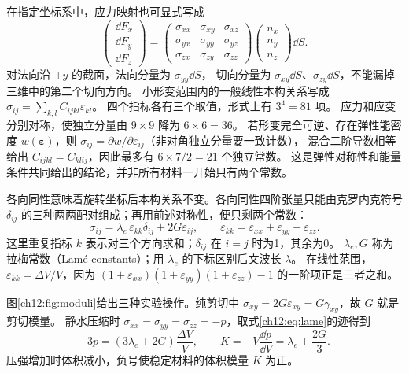 在指定坐标系中，应力映射也可显式写成
\[
 \begin{pmatrix}\dd F_x\\\dd F_y\\\dd F_z\end{pmatrix}
 =
 \begin{pmatrix}
 \sigma_{xx}&\sigma_{xy}&\sigma_{xz}\\
 \sigma_{yx}&\sigma_{yy}&\sigma_{yz}\\
 \sigma_{zx}&\sigma_{zy}&\sigma_{zz}
 \end{pmatrix}
 \begin{pmatrix}n_x\\n_y\\n_z\end{pmatrix}\dd S.
\]
对法向沿 $+y$ 的截面，法向分量为 $\sigma_{yy}\dd S$，
切向分量为 $\sigma_{xy}\dd S$、$\sigma_{zy}\dd S$，不能漏掉三维中的第二个切向方向。
小形变范围内的一般线性本构关系写成
$\sigma_{ij}=\sum_{k,l}C_{ijkl}\varepsilon_{kl}$。
四个指标各有三个取值，形式上有 $3^4=81$ 项。
应力和应变分别对称，使独立分量由 $9\times9$ 降为 $6\times6=36$。
若形变完全可逆、存在弹性能密度 $w(\boldsymbol\varepsilon)$，则
$\sigma_{ij}=\partial w/\partial\varepsilon_{ij}$（非对角独立分量要一致计数），
混合二阶导数相等给出 $C_{ijkl}=C_{klij}$，因此最多有 $6\times7/2=21$ 个独立常数。
这是弹性对称性和能量条件共同给出的结论，并非所有材料一开始只有两个常数。

各向同性意味着旋转坐标后本构关系不变。各向同性四阶张量只能由克罗内克符号
$\delta_{ij}$ 的三种两两配对组成；再用前述对称性，便只剩两个常数：
\begin{equation}
 \sigma_{ij}=\lambda_e\,\varepsilon_{kk}\delta_{ij}+2G\varepsilon_{ij},
 \qquad \varepsilon_{kk}=\varepsilon_{xx}+\varepsilon_{yy}+\varepsilon_{zz}.
 \label{ch12:eq:lame}
\end{equation}
这里重复指标 $k$ 表示对三个方向求和；$\delta_{ij}$ 在 $i=j$ 时为1，其余为0。
$\lambda_e,G$ 称为拉梅常数（Lamé constants）；用 $\lambda_e$ 的下标区别后文波长 $\lambda$。
在线性范围，$\varepsilon_{kk}=\Delta V/V$，因为
$(1+\varepsilon_{xx})(1+\varepsilon_{yy})(1+\varepsilon_{zz})-1$
的一阶项正是三者之和。

图\ref{ch12:fig:moduli}给出三种实验操作。纯剪切中
$\sigma_{xy}=2G\varepsilon_{xy}=G\gamma_{xy}$，故 $G$ 就是剪切模量。
静水压缩时 $\sigma_{xx}=\sigma_{yy}=\sigma_{zz}=-p$，取式\eqref{ch12:eq:lame}的迹得到
\begin{equation}
 -3p=(3\lambda_e+2G)\frac{\Delta V}{V},\qquad
 K=-V\frac{\dd p}{\dd V}=\lambda_e+\frac{2G}{3}.
 \label{ch12:eq:bulk}
\end{equation}
压强增加时体积减小，负号使稳定材料的体积模量 $K$ 为正。


